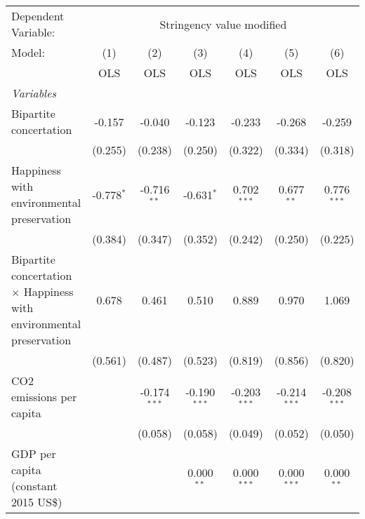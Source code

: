 
\begingroup
\centering
\begin{tabular}{lcccccc}
   \toprule
   Dependent Variable: & \multicolumn{6}{c}{Stringency value modified}\\
   Model:                                                                     & (1)          & (2)            & (3)            & (4)            & (5)            & (6)\\  
                                                                              &  OLS         & OLS            & OLS            & OLS            & OLS            & OLS\\  
   \midrule
   \emph{Variables}\\
   Bipartite concertation                                                     & -0.157       & -0.040         & -0.123         & -0.233         & -0.268         & -0.259\\   
                                                                              & (0.255)      & (0.238)        & (0.250)        & (0.322)        & (0.334)        & (0.318)\\   
   Happiness with environmental preservation                                  & -0.778$^{*}$ & -0.716$^{**}$  & -0.631$^{*}$   & 0.702$^{***}$  & 0.677$^{**}$   & 0.776$^{***}$\\   
                                                                              & (0.384)      & (0.347)        & (0.352)        & (0.242)        & (0.250)        & (0.225)\\   
   Bipartite concertation $\times$ Happiness with environmental preservation  & 0.678        & 0.461          & 0.510          & 0.889          & 0.970          & 1.069\\   
                                                                              & (0.561)      & (0.487)        & (0.523)        & (0.819)        & (0.856)        & (0.820)\\   
   CO2 emissions per capita                                                   &              & -0.174$^{***}$ & -0.190$^{***}$ & -0.203$^{***}$ & -0.214$^{***}$ & -0.208$^{***}$\\   
                                                                              &              & (0.058)        & (0.058)        & (0.049)        & (0.052)        & (0.050)\\   
   GDP per capita (constant 2015 US\$)                                        &              &                & 0.000$^{**}$   & 0.000$^{***}$  & 0.000$^{***}$  & 0.000$^{**}$\\   

\end{tabular}
